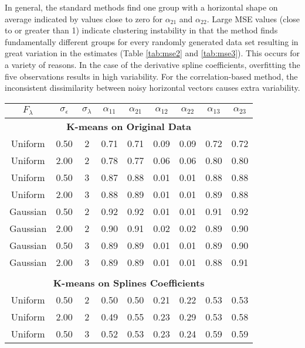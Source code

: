  In general, the standard methods find one group with a horizontal shape on average indicated by values close to zero for $\alpha_{21}$ and $\alpha_{22}$. Large MSE values (close to or greater than 1) indicate clustering instability in that the method finds fundamentally different groups for every randomly generated data set resulting in great variation in the estimates (Table \ref{tab:mse2} and \ref{tab:mse3}). This occurs for a variety of reasons. In the case of the derivative spline coefficients, overfitting the five observations results in high variability. For the correlation-based method, the inconsistent dissimilarity between noisy horizontal vectors causes extra variability.

\begin{table}[ht]
\begin{center}
\begin{tabular}{ccc|cccccc}
  \thickhline $F_{\lambda}$&$\sigma_{\epsilon}$&$\sigma_{\lambda}$&$\alpha_{11}$&$\alpha_{21}$&$\alpha_{12}$&$\alpha_{22}$&$\alpha_{13}$&$\alpha_{23}$\\ \hline\multicolumn{9}{c}{\textbf{K-means on Original Data}}\\ Uniform & 0.50 &   2 & 0.71 & 0.71 & 0.09 & 0.09 & 0.72 & 0.72 \\ 
  Uniform & 2.00 &   2 & 0.78 & 0.77 & 0.06 & 0.06 & 0.80 & 0.80 \\ 
  Uniform & 0.50 &   3 & 0.87 & 0.88 & 0.01 & 0.01 & 0.88 & 0.88 \\ 
  Uniform & 2.00 &   3 & 0.88 & 0.89 & 0.01 & 0.01 & 0.89 & 0.88 \\ 
  Gaussian & 0.50 &   2 & 0.92 & 0.92 & 0.01 & 0.01 & 0.91 & 0.92 \\ 
  Gaussian & 2.00 &   2 & 0.90 & 0.91 & 0.02 & 0.02 & 0.89 & 0.90 \\ 
  Gaussian & 0.50 &   3 & 0.89 & 0.89 & 0.01 & 0.01 & 0.89 & 0.90 \\ 
  Gaussian & 2.00 &   3 & 0.89 & 0.89 & 0.01 & 0.01 & 0.88 & 0.91 \\ 
   \\ \multicolumn{9}{c}{\textbf{K-means on Splines Coefficients}}\\Uniform & 0.50 &   2 & 0.50 & 0.50 & 0.21 & 0.22 & 0.53 & 0.53 \\ 
  Uniform & 2.00 &   2 & 0.49 & 0.55 & 0.23 & 0.29 & 0.53 & 0.58 \\ 
  Uniform & 0.50 &   3 & 0.52 & 0.53 & 0.23 & 0.24 & 0.59 & 0.59 \\ 

\end{tabular}
\end{center}
\end{table}
